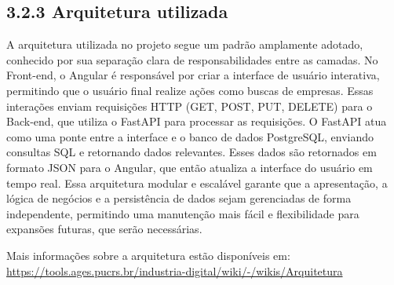 \hypertarget{__RefHeading___Toc4777_3118176633}{}
\subsection*{3.2.3 Arquitetura utilizada}
\label{ages-ii:text-h-0044}

\indent\href{https://tools.ages.pucrs.br/industria-digital/wiki/-/wikis/Arquitetura}{\mbox{}}%
A arquitetura utilizada no projeto segue um padrão amplamente adotado, conhecido por sua separação clara de responsabilidades entre as camadas. No Front-end, o Angular\space\cite{ages-ii-angular} é responsável por criar a interface de usuário interativa, permitindo que o usuário final realize ações como buscas de empresas. Essas interações enviam requisições HTTP\space\cite{ages-ii-http-rfc9110} (GET, POST, PUT, DELETE) para o Back-end, que utiliza o FastAPI\space\cite{ages-ii-fastapi}\originalspace{} para processar as requisições. O FastAPI atua como uma ponte entre a interface e o banco de dados PostgreSQL\space\cite{ages-iv-postgresql}, enviando consultas SQL e retornando dados relevantes. Esses dados são retornados em formato JSON\space\cite{ages-ii-json-rfc8259} para o Angular, que então atualiza a interface do usuário em tempo real. Essa arquitetura modular e escalável garante que a apresentação, a lógica de negócios e a persistência de dados sejam gerenciadas de forma independente, permitindo uma manutenção mais fácil e flexibilidade para expansões futuras, que serão necessárias.\par


\indent Mais informações sobre a arquitetura estão disponíveis em: \url{https://tools.ages.pucrs.br/industria-digital/wiki/-/wikis/Arquitetura}\par
